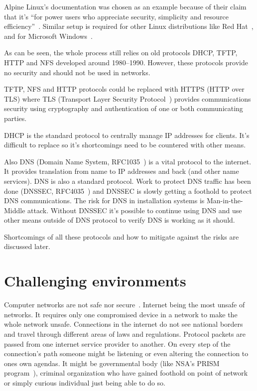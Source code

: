 Alpine Linux's documentation was chosen as an example because of their
claim that it's ``for power users who appreciate security, simplicity
and resource efficiency''~\cite{alpine-about}. Similar setup is
required for other Linux distributions like Red
Hat~\cite{redhat-network-install}, and for Microsoft
Windows~\cite{windows-network-install}.

As can be seen, the whole process still relies on old protocols DHCP,
TFTP, HTTP and NFS developed around 1980--1990. However, these
protocols provide no security and should not be used in
networks.

TFTP, NFS and HTTP protocols could be replaced with HTTPS (HTTP over
TLS) where TLS (Transport Layer Security Protocol~\cite{RFC5246})
provides communications security using cryptography and authentication
of one or both communicating parties.

DHCP is the standard protocol to centrally manage IP addresses for
clients. It's difficult to replace so it's shortcomings need to be
countered with other means.

Also DNS (Domain Name System, RFC1035~\cite{rfc1035}) is a vital
protocol to the internet. It provides translation from name to IP
addresses and back (and other name services). DNS is also a standard
protocol. Work to protect DNS traffic has been done (DNSSEC,
RFC4035~\cite{rfc4035}) and DNSSEC is slowly getting a foothold to
protect DNS communications. The risk for DNS in installation systems
is Man-in-the-Middle attack. Without DNSSEC it's possible to continue
using DNS and use other means outside of DNS protocol to verify DNS is
working as it should.

Shortcomings of all these protocols and how to mitigate against the
risks are discussed later.

\section{Challenging environments}

Computer networks are not safe nor secure~\cite{beyondcorp}. Internet
being the most unsafe of networks. It requires only one compromised
device in a network to make the whole network unsafe. Connections in
the internet do not see national borders and travel through different
areas of laws and regulations. Protocol packets are passed from one
internet service provider to another. On every step of the
connection's path someone might be listening or even altering the
connection to ones own agendas. It might be governmental body (like
NSA's PRISM program~\cite{nsa-prism}), criminal organization who have
gained foothold on point of network or simply curious individual just
being able to do so.

